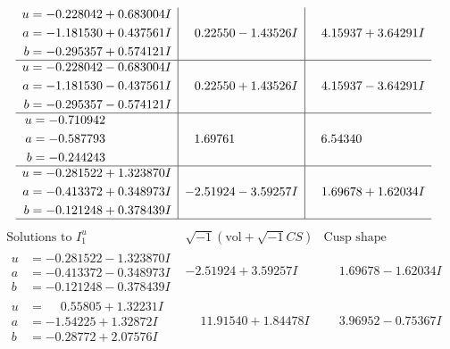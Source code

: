 \documentclass[1p]{elsarticle_modified}
\theoremstyle{definition}
\newcommand{\I}{\sqrt{-1}}
\begin{document}
$$\begin{array}{c|c|c}
\begin{aligned}
u &= -0.228042 + 0.683004 I \\
a &= -1.181530 + 0.437561 I \\
b &= -0.295357 + 0.574121 I\end{aligned}
 & \phantom{-}0.22550 - 1.43526 I & \phantom{-}4.15937 + 3.64291 I \\ \hline\begin{aligned}
u &= -0.228042 - 0.683004 I \\
a &= -1.181530 - 0.437561 I \\
b &= -0.295357 - 0.574121 I\end{aligned}
 & \phantom{-}0.22550 + 1.43526 I & \phantom{-}4.15937 - 3.64291 I \\ \hline\begin{aligned}
u &= -0.710942\phantom{ +0.000000I} \\
a &= -0.587793\phantom{ +0.000000I} \\
b &= -0.244243\phantom{ +0.000000I}\end{aligned}
 & \phantom{-}1.69761\phantom{ +0.000000I} & \phantom{-}6.54340\phantom{ +0.000000I} \\ \hline\begin{aligned}
u &= -0.281522 + 1.323870 I \\
a &= -0.413372 + 0.348973 I \\
b &= -0.121248 + 0.378439 I\end{aligned}
 & -2.51924 - 3.59257 I & \phantom{-}1.69678 + 1.62034 I\\
 \hline 
 \end{array}$$\newpage$$\begin{array}{c|c|c}  
\text{Solutions to }I^u_{1}& \I (\text{vol} + \sqrt{-1}CS) & \text{Cusp shape}\\
 \hline 
\begin{aligned}
u &= -0.281522 - 1.323870 I \\
a &= -0.413372 - 0.348973 I \\
b &= -0.121248 - 0.378439 I\end{aligned}
 & -2.51924 + 3.59257 I & \phantom{-}1.69678 - 1.62034 I \\ \hline\begin{aligned}
u &= \phantom{-}0.55805 + 1.32231 I \\
a &= -1.54225 + 1.32872 I \\
b &= -0.28772 + 2.07576 I\end{aligned}
 & \phantom{-}11.91540 + 1.84478 I & \phantom{-}3.96952 - 0.75367 I \\ \hline\begin{aligned}

\end{aligned}
\end{array}$$
\end{document}
